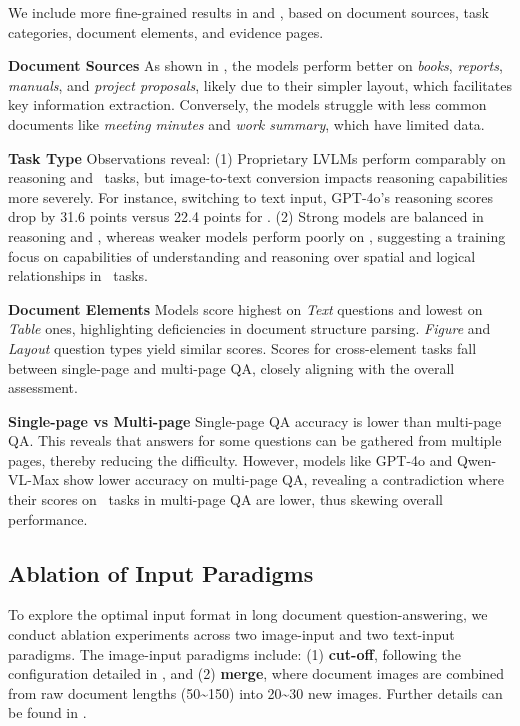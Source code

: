 We include more fine-grained results in  and , based on document sources, task categories, document elements, and evidence pages.

\noindent\textbf{Document Sources} 
As shown in , the models perform better on \emph{books}, \emph{reports}, \emph{manuals}, and \emph{project proposals}, likely due to their simpler layout, which facilitates key information extraction. Conversely, the models struggle with less common documents like \emph{meeting minutes} and \emph{work summary}, which have limited data.

\noindent\textbf{Task Type} 
Observations reveal: (1) Proprietary LVLMs perform comparably on reasoning and \locating~tasks, but image-to-text conversion impacts reasoning capabilities more severely. For instance, switching to text input, GPT-4o's reasoning scores drop by 31.6 points versus 22.4 points for \locating. (2) Strong models are balanced in reasoning and \locating, whereas weaker models perform poorly on \locating, suggesting a training focus on capabilities of understanding and reasoning over spatial and logical relationships in \locating~tasks.

\noindent\textbf{Document Elements} 
Models score highest on \emph{Text} questions and lowest on \emph{Table} ones, highlighting deficiencies in document structure parsing. \emph{Figure} and \emph{Layout} question types yield similar scores. Scores for cross-element tasks fall between single-page and multi-page QA, closely aligning with the overall assessment.


\noindent\textbf{Single-page vs Multi-page} 
Single-page QA accuracy is lower than multi-page QA. This reveals that answers for some questions can be gathered from multiple pages, thereby reducing the difficulty. However, models like GPT-4o and Qwen-VL-Max show lower accuracy on multi-page QA, revealing a contradiction where their scores on \locating~tasks in multi-page QA are lower, thus skewing overall performance.






\subsection{Ablation of Input Paradigms}
\label{subsec: ablation_of_input_paradigms}

To explore the optimal input format in long document question-answering, we conduct ablation experiments across two image-input and two text-input paradigms. The image-input paradigms include: (1) \textbf{cut-off}, following the configuration detailed in , and (2) \textbf{merge}, where document images are combined from raw document lengths (50\textasciitilde150) into 20\textasciitilde30 new images. Further details can be found in . 

